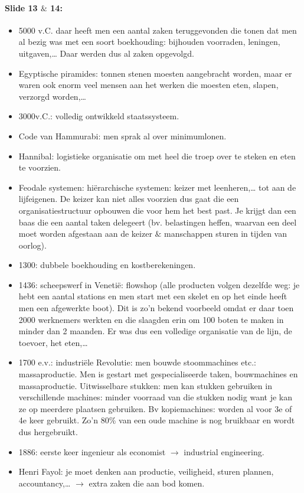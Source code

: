 \documentclass[10pt,a4paper]{report}
\begin{document}
\paragraph{Slide 13 $\&$ 14:}
\begin{itemize}
\item 5000 v.C. daar heeft men een aantal zaken teruggevonden die tonen dat men al bezig was met een soort boekhouding: bijhouden voorraden, leningen, uitgaven,… Daar werden dus al zaken opgevolgd.
\item Egyptische piramides: tonnen stenen moesten aangebracht worden, maar er waren ook enorm veel mensen aan het werken die moesten eten, slapen, verzorgd worden,…
\item 3000v.C.: volledig ontwikkeld staatssysteem.
\item Code van Hammurabi: men sprak al over minimumlonen.
\item Hannibal: logistieke organisatie om met heel die troep over te steken en eten te voorzien.
\item Feodale systemen: hi\"erarchische systemen: keizer met leenheren,… tot aan de lijfeigenen. De keizer kan niet alles voorzien dus gaat die een organisatiestructuur opbouwen die voor hem het best past. Je krijgt dan een baas die een aantal taken delegeert (bv. belastingen heffen, waarvan een deel moet worden afgestaan aan de keizer $\&$ manschappen sturen in tijden van oorlog).
\item 1300: dubbele boekhouding en kostberekeningen.
\item 1436: scheepswerf in Venetië: flowshop (alle producten volgen dezelfde weg: je hebt een aantal stations en men start met een skelet en op het einde heeft men een afgewerkte boot). Dit is zo'n bekend voorbeeld omdat er daar toen 2000 werknemers werkten en die slaagden erin om 100 boten te maken in minder dan 2 maanden. Er was dus een volledige organisatie van de lijn, de toevoer, het eten,…
\item 1700 e.v.: industri\"ele Revolutie: men bouwde stoommachines etc.: massaproductie. Men is gestart met gespecialiseerde taken, bouwmachines en massaproductie. Uitwisselbare stukken: men kan stukken gebruiken in verschillende machines: minder voorraad van die stukken nodig want je kan ze op meerdere plaatsen gebruiken. Bv kopiemachines: worden al voor 3e of 4e keer gebruikt. Zo'n 80\% van een oude machine is nog bruikbaar en wordt dus hergebruikt.
\item 1886: eerste keer ingenieur als economist $\rightarrow$ industrial engineering.
\item Henri Fayol: je moet denken aan productie, veiligheid, sturen plannen, accountancy,… $\rightarrow$ extra zaken die aan bod komen.
	\end{itemize}
	
\end{document}
